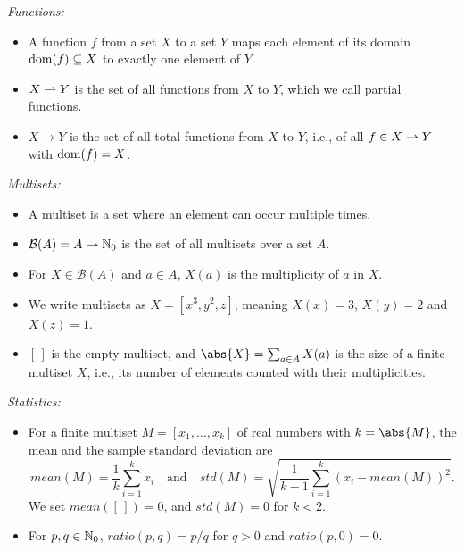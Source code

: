 \noindent\emph{Functions:}
\begin{itemize}[beginpenalty=10000]
	\item A function $f$ from a set $X$ to a set $Y$ maps each element of its domain $\operatorname*{dom}(f) \subseteq X$ to exactly one element of $Y$.
	\item $X \rightharpoonup Y$ is the set of all functions from $X$ to $Y$, which we call partial functions.
	\item $X \to Y$ is the set of all total functions from $X$ to $Y$, i.e., of all $f \in X \rightharpoonup Y$ with $\operatorname*{dom}(f) = X$.
\end{itemize}

\noindent\emph{Multisets:}
\begin{itemize}[beginpenalty=10000]
	\item A multiset is a set where an element can occur multiple times.
	\item $\mathcal{B}(A) = A \to \mathbb N_0$ is the set of all multisets over a set $A$.
	\item For $X \in \mathcal{B}(A)$ and $a \in A$, $X(a)$ is the multiplicity of $a$ in $X$.
	\item We write multisets as $X = [x^3, y^2, z]$, meaning $X(x) = 3$, $X(y) = 2$ and $X(z) = 1$.
	\item $[\,]$ is the empty multiset, and $\abs{X} = \sum_{a \in A} X(a)$ is the size of a finite multiset $X$, i.e., its number of elements counted with their multiplicities.
\end{itemize}

\noindent\emph{Statistics:}
\begin{itemize}[beginpenalty=10000]
	\item For a finite multiset $M = [x_1, \dots, x_k]$ of real numbers with $k = \abs{M}$, the mean and the sample standard deviation are
	      \[
		      \mathit{mean}(M) = \frac{1}{k} \sum_{i=1}^{k} x_i \quad\text{and}\quad \mathit{std}(M) = \sqrt{\frac{1}{k - 1} \sum_{i=1}^{k} (x_i - \mathit{mean}(M))^2}.
	      \]
	      We set $\mathit{mean}([\,]) = 0$, and $\mathit{std}(M) = 0$ for $k < 2$.
	\item For $p, q \in \mathbb N_0$, $\mathit{ratio}(p, q) = p / q$ for $q > 0$ and $\mathit{ratio}(p, 0) = 0$.
\end{itemize}


